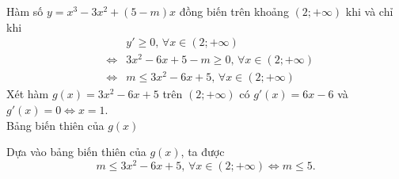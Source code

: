 \begin{vd}
{\begin{enumerate}[\faPencilSquareO]
	Hàm số $y=x^3-3x^2+(5-m)x$ đồng biến trên khoảng $(2;+\infty)$ khi và chỉ khi
	\allowdisplaybreaks
	\begin{eqnarray*}
		&&y'\ge 0,\,\forall x\in (2;+\infty)\\
		&\Leftrightarrow& 3x^2-6x+5-m\ge 0,\,\forall x\in (2;+\infty)\\
		&\Leftrightarrow& m\le 3x^2-6x+5, \,\forall x\in (2;+\infty)
	\end{eqnarray*}
	Xét hàm $g(x)=3x^2-6x+5$ trên $(2;+\infty)$ có $g'(x)=6x-6$ và $g'(x)=0\Leftrightarrow x=1$.\\
	Bảng biến thiên của $g(x)$
	\begin{center}
	\end{center}
	Dựa vào bảng biến thiên của $g(x)$, ta được
	$$m\le 3x^2-6x+5, \,\forall x\in (2;+\infty) \Leftrightarrow m\le 5.$$
\end{enumerate}}
\end{vd}

